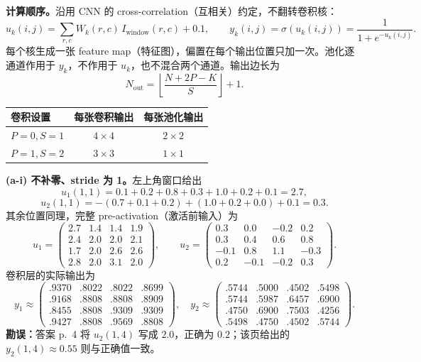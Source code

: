 \begin{checkedsolution}
\textbf{计算顺序。}沿用 CNN 的 cross-correlation（互相关）约定，不翻转卷积核：
\[
u_k(i,j)=\sum_{r,c}W_k(r,c)\,I_{\mathrm{window}}(r,c)+0.1,
\qquad y_k(i,j)=\sigma(u_k(i,j))=\frac1{1+e^{-u_k(i,j)}}.
\]
每个核生成一张 feature map（特征图），偏置在每个输出位置只加一次。池化逐通道作用于 $y_k$，不作用于 $u_k$，也不混合两个通道。输出边长为
\[
N_{\mathrm{out}}=\left\lfloor\frac{N+2P-K}{S}\right\rfloor+1.
\]
\begin{center}
\begin{tabular}{@{}lcc@{}}
\toprule
卷积设置 & 每张卷积输出 & 每张池化输出 \\
\midrule
$P=0,S=1$ & $4\times4$ & $2\times2$ \\
$P=1,S=2$ & $3\times3$ & $1\times1$ \\
\bottomrule
\end{tabular}
\end{center}

\textbf{(a-i) 不补零、stride 为 1。}左上角窗口给出
\[
u_1(1,1)=0.1+0.2+0.8+0.3+1.0+0.2+0.1=2.7,
\]
\[
u_2(1,1)=-(0.7+0.1+0.2)+(1.0+0.2+0.0)+0.1=0.3.
\]
其余位置同理，完整 pre-activation（激活前输入）为
\[
u_1=\begin{pmatrix}2.7&1.4&1.4&1.9\\2.4&2.0&2.0&2.1\\1.7&2.0&2.6&2.6\\2.8&2.0&3.1&2.0\end{pmatrix},\qquad
u_2=\begin{pmatrix}0.3&0.0&-0.2&0.2\\0.3&0.4&0.6&0.8\\-0.1&0.8&1.1&-0.3\\0.2&-0.1&-0.2&0.3\end{pmatrix}.
\]
卷积层的实际输出为
\[
y_1\approx\begin{pmatrix}.9370&.8022&.8022&.8699\\.9168&.8808&.8808&.8909\\.8455&.8808&.9309&.9309\\.9427&.8808&.9569&.8808\end{pmatrix},\quad
y_2\approx\begin{pmatrix}.5744&.5000&.4502&.5498\\.5744&.5987&.6457&.6900\\.4750&.6900&.7503&.4256\\.5498&.4750&.4502&.5744\end{pmatrix}.
\]
\textbf{勘误：}答案 p.~4 将 $u_2(1,4)$ 写成 $2.0$，正确为 $0.2$；该页给出的 $y_2(1,4)\approx0.55$ 则与正确值一致。


\end{checkedsolution}
